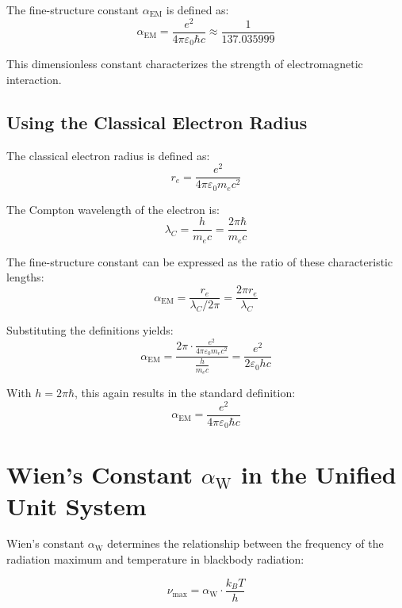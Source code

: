 \documentclass[12pt,a4paper]{article}
\newcommand{\alphaEM}{\alpha_{\text{EM}}}
\newcommand{\alphaW}{\alpha_{\text{W}}}
\begin{document}
	The fine-structure constant \(\alphaEM\) is defined as:
	\begin{equation}
		\alphaEM = \frac{e^2}{4\pi \varepsilon_0 \hbar c} \approx \frac{1}{137.035999}
	\end{equation}
	
	This dimensionless constant characterizes the strength of electromagnetic interaction.
	
	\subsection{Using the Classical Electron Radius}
	
	The classical electron radius is defined as:
	\begin{equation}
		r_e = \frac{e^2}{4\pi \varepsilon_0 m_e c^2}
	\end{equation}
	
	The Compton wavelength of the electron is:
	\begin{equation}
		\lambda_C = \frac{h}{m_e c} = \frac{2\pi\hbar}{m_e c}
	\end{equation}
	
	The fine-structure constant can be expressed as the ratio of these characteristic lengths:
	\begin{equation}
		\alphaEM = \frac{r_e}{\lambda_C/2\pi} = \frac{2\pi r_e}{\lambda_C}
	\end{equation}
	
	Substituting the definitions yields:
	\begin{equation}
		\alphaEM = \frac{2\pi \cdot \frac{e^2}{4\pi \varepsilon_0 m_e c^2}}{\frac{h}{m_e c}} = \frac{e^2}{2\varepsilon_0 h c}
	\end{equation}
	
	With \(h = 2\pi\hbar\), this again results in the standard definition:
	\begin{equation}
		\alphaEM = \frac{e^2}{4\pi \varepsilon_0 \hbar c}
	\end{equation}
	
	\section{Wien's Constant \(\alphaW\) in the Unified Unit System}
	
	Wien's constant \(\alphaW\) determines the relationship between the frequency of the radiation maximum and temperature in blackbody radiation:
	
	\begin{equation}
		\nu_{\text{max}} = \alphaW \cdot \frac{k_B T}{h}
	\end{equation}
	
\end{document}

